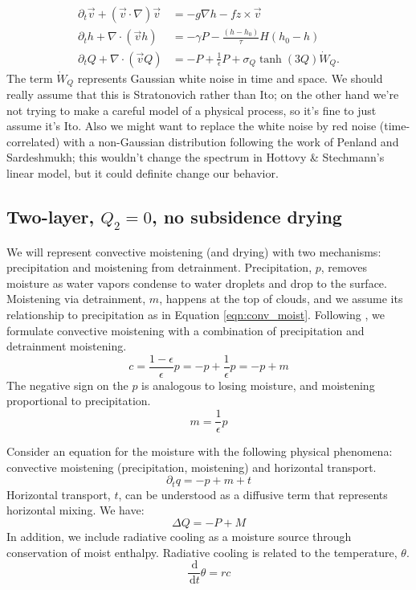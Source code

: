 \documentclass[10pt]{article}
\newcommand{\rmd}{\,\mathrm{d}}
\begin{document}
\begin{align}
\partial_t \vec{v} + \left( \vec{v}\cdot \nabla \right)\vec{v} &= -g\nabla h - f\hat{z}\times \vec{v}\\
\partial_t h + \nabla \cdot \left(\vec{v}h\right) &= -\gamma P -\frac{(h-h_0)}{\tau}H(h_0-h)\\
\partial_t Q + \nabla \cdot \left(\vec{v}Q\right) &= -P + \frac{1}{\epsilon}P + \sigma_Q \tanh(3Q)\dot{W}_Q.
\end{align}
The term $\dot{W}_Q$ represents Gaussian white noise in time and space. 
We should really assume that this is Stratonovich rather than Ito; on the other hand we're not trying to make a careful model of a physical process, so it's fine to just assume it's Ito.
Also we might want to replace the white noise by red noise (time-correlated) with a non-Gaussian distribution following the work of Penland and Sardeshmukh; this wouldn't change the spectrum in Hottovy \& Stechmann's linear model, but it could definite change our behavior.

\subsection{Two-layer, $Q_2 = 0$, no subsidence drying}


We will represent convective moistening (and drying) with two mechanisms: precipitation and moistening from detrainment.
Precipitation, $p$, removes moisture as water vapors condense to water droplets and drop to the surface.
Moistening via detrainment, $m$, happens at the top of clouds, and we assume its relationship to precipitation as in Equation \ref{eqn:conv_moist}.
Following \citet{CM2013}, we formulate convective moistening with a combination of precipitation and detrainment moistening.
\begin{equation}
c = \frac{1-\epsilon}{\epsilon} p = -p + \frac{1}{\epsilon}p = -p + m
\label{eqn:conv_moist}
\end{equation}
The negative sign on the $p$ is analogous to losing moisture, and moistening proportional to precipitation.
\begin{equation}
m = \frac{1}{\epsilon} p
\end{equation}

Consider an equation for the moisture with the following physical phenomena: convective moistening (precipitation, moistening) and horizontal transport.
\begin{equation}
\partial_t q = -p + m + t
\end{equation}
Horizontal transport, $t$, can be understood as a diffusive term that represents horizontal mixing.
{\color{blue} We have:
\begin{equation}
\Delta Q = -P + M
\label{neweq}
\end{equation} 
}
In addition, we include radiative cooling as a moisture source through conservation of moist enthalpy.  
Radiative cooling is related to the temperature, $\theta$.
\begin{equation}
\frac{\rmd}{\rmd t}\theta = rc
\end{equation}
\end{document}

